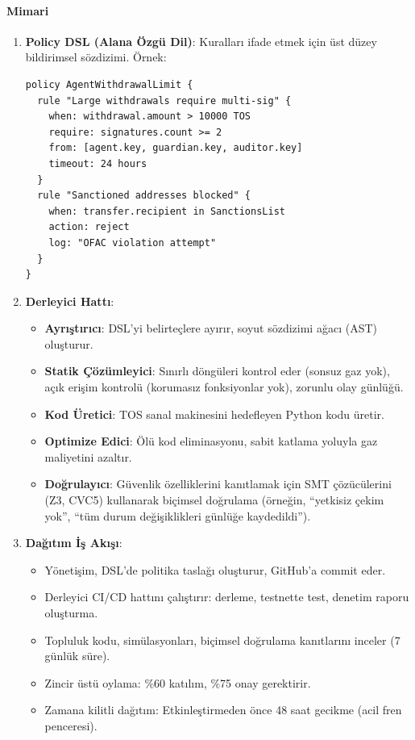 \documentclass[11pt]{article}
\begin{document}
\paragraph{Mimari}
\begin{enumerate}[noitemsep]
  \item \textbf{Policy DSL (Alana Özgü Dil)}: Kuralları ifade etmek için üst düzey bildirimsel sözdizimi. Örnek:
  \begin{verbatim}
policy AgentWithdrawalLimit {
  rule "Large withdrawals require multi-sig" {
    when: withdrawal.amount > 10000 TOS
    require: signatures.count >= 2
    from: [agent.key, guardian.key, auditor.key]
    timeout: 24 hours
  }
  rule "Sanctioned addresses blocked" {
    when: transfer.recipient in SanctionsList
    action: reject
    log: "OFAC violation attempt"
  }
}
  \end{verbatim}
  \item \textbf{Derleyici Hattı}:
    \begin{itemize}[noitemsep]
      \item \textbf{Ayrıştırıcı}: DSL'yi belirteçlere ayırır, soyut sözdizimi ağacı (AST) oluşturur.
      \item \textbf{Statik Çözümleyici}: Sınırlı döngüleri kontrol eder (sonsuz gaz yok), açık erişim kontrolü (korumasız fonksiyonlar yok), zorunlu olay günlüğü.
      \item \textbf{Kod Üretici}: TOS sanal makinesini hedefleyen Python kodu üretir.
      \item \textbf{Optimize Edici}: Ölü kod eliminasyonu, sabit katlama yoluyla gaz maliyetini azaltır.
      \item \textbf{Doğrulayıcı}: Güvenlik özelliklerini kanıtlamak için SMT çözücülerini (Z3, CVC5) kullanarak biçimsel doğrulama (örneğin, ``yetkisiz çekim yok'', ``tüm durum değişiklikleri günlüğe kaydedildi'').
    \end{itemize}
  \item \textbf{Dağıtım İş Akışı}:
    \begin{itemize}[noitemsep]
      \item Yönetişim, DSL'de politika taslağı oluşturur, GitHub'a commit eder.
      \item Derleyici CI/CD hattını çalıştırır: derleme, testnette test, denetim raporu oluşturma.
      \item Topluluk kodu, simülasyonları, biçimsel doğrulama kanıtlarını inceler (7 günlük süre).
      \item Zincir üstü oylama: \%60 katılım, \%75 onay gerektirir.
      \item Zamana kilitli dağıtım: Etkinleştirmeden önce 48 saat gecikme (acil fren penceresi).
    \end{itemize}
\end{enumerate}
\end{document}

